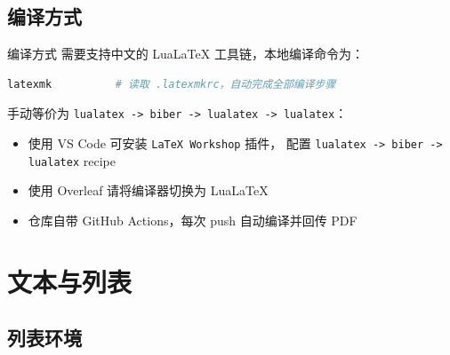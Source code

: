 \documentclass[aspectratio=169]{beamer}
\begin{document}
\subsection{编译方式}

\begin{frame}[fragile]{编译方式}
    需要支持中文的 Lua\LaTeX{} 工具链，本地编译命令为：
    \begin{lstlisting}[language=bash,numbers=none]
latexmk          # 读取 .latexmkrc，自动完成全部编译步骤
\end{lstlisting}
    手动等价为 \texttt{lualatex -> biber -> lualatex -> lualatex}：
    \begin{itemize}
        \item 使用 VS Code 可安装 \texttt{LaTeX Workshop} 插件，
              配置 \texttt{lualatex -> biber -> lualatex} recipe
        \item 使用 Overleaf 请将编译器切换为 LuaLaTeX
        \item 仓库自带 GitHub Actions，每次 push 自动编译并回传 PDF
    \end{itemize}
\end{frame}

\section{文本与列表}

\subsection{列表环境}
\end{document}
